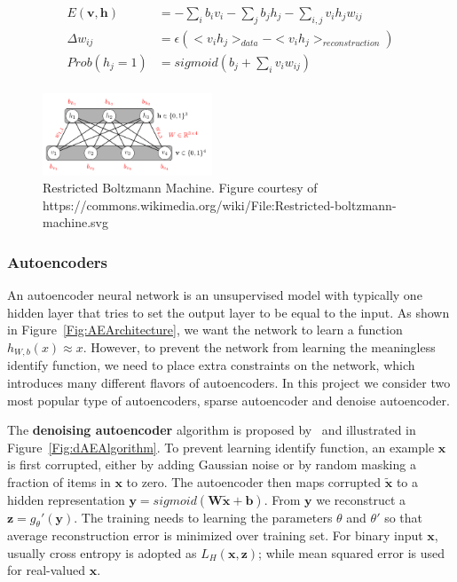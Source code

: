 \begin{align}
        E(\mathbf{v, h}) &= -\sum_i b_i v_i - \sum_j b_j h_j - \sum_{i, j} v_i h_j w_{ij} \\
        \Delta w_{ij} &= \epsilon (<v_i h_j>_{data} - <v_i h_j>_{reconstruction}) \\
        Prob(h_j = 1) &= sigmoid(b_j + \sum_i{v_i w_{ij}}) \\
\end{align}

\begin{figure}[h]
\centering
\includegraphics[width=0.45\textwidth]{figures/rbm.png}
\caption{Restricted Boltzmann Machine.
        Figure courtesy of https://commons.wikimedia.org/wiki/File:Restricted-boltzmann-machine.svg}
\label{Fig:RBMArchitecture}
\end{figure}



\subsubsection{Autoencoders}
An autoencoder neural network is an unsupervised model with typically one hidden layer that
tries to set the output layer to be equal to the input.
As shown in Figure~\ref{Fig:AEArchitecture}, we want the network to
learn a function $h_{W, b}(x) \approx x$.
However, to prevent the network from learning the meaningless identify function,
we need to place extra constraints on the network, which introduces many different
flavors of autoencoders.
In this project we consider two most popular type of autoencoders, sparse autoencoder and
denoise autoencoder.

The \textbf{denoising autoencoder} algorithm is proposed by~\cite{DenoiseAE} and illustrated in
Figure~\ref{Fig:dAEAlgorithm}.
To prevent learning identify function, an example $\mathbf{x}$ is first corrupted, either by
adding Gaussian noise or by random masking a fraction of items in $\mathbf{x}$ to zero.
The autoencoder then maps corrupted $\mathbf{\tilde{x}}$ to a hidden representation $\mathbf{y} = sigmoid(\mathbf{W}\tilde{\mathbf{x}} + \mathbf{b})$.
From $\mathbf{y}$ we reconstruct a $\mathbf{z}=g_\theta'(\mathbf{y})$.
The training needs to learning the parameters $\theta$ and $\theta'$ so that average reconstruction error is minimized over training set.
For binary input $\mathbf{x}$, usually cross entropy is adopted as $L_H(\mathbf{x}, \mathbf{z})$;
while mean squared error is used for real-valued $\mathbf{x}$.

